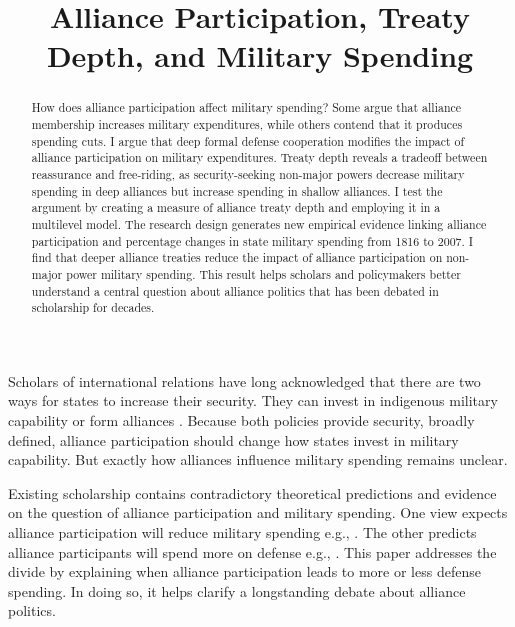 \documentclass[12pt]{article}
\title{\textbf{Alliance Participation, Treaty Depth, and Military Spending}}
\date{}
\begin{document}
\maketitle 

\doublespace 

\begin{abstract}
How does alliance participation affect military spending? 
Some argue that alliance membership increases military expenditures, while others contend that it produces spending cuts.
I argue that deep formal defense cooperation modifies the impact of alliance participation on military expenditures.  
Treaty depth reveals a tradeoff between reassurance and free-riding, as security-seeking non-major powers decrease military spending in deep alliances but increase spending in shallow alliances.   
I test the argument by creating a measure of alliance treaty depth and employing it in a multilevel model. 
The research design generates new empirical evidence linking alliance participation and percentage changes in state military spending from 1816 to 2007. 
I find that deeper alliance treaties reduce the impact of alliance participation on non-major power military spending.  
This result helps scholars and policymakers better understand a central question about alliance politics that has been debated in scholarship for decades. 
\end{abstract}


\newpage 




Scholars of international relations have long acknowledged that there are two ways for states to increase their security. 
They can invest in indigenous military capability or form alliances \citep{Morgenthau1948, Altfield1984, Morrow1993}.
Because both policies provide security, broadly defined, alliance participation should change how states invest in military capability. 
But exactly how alliances influence military spending remains unclear. 


Existing scholarship contains contradictory theoretical predictions and evidence on the question of alliance participation and military spending. 
One view expects alliance participation will reduce military spending e.g., \citep{Morrow1993, Conybeare1994}. 
The other predicts alliance participants will spend more on defense e.g., \citep{Diehl1994, MorganPalmer2006}.
This paper addresses the divide by explaining when alliance participation leads to more or less defense spending. 
In doing so, it helps clarify a longstanding debate about alliance politics.
\end{document}
